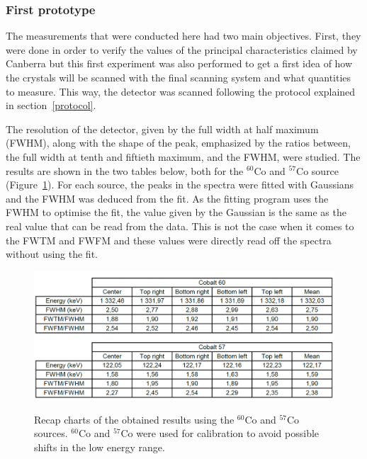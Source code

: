 \documentclass[11pt,a4paper]{article}
\begin{document}
\subsubsection{First prototype}

The measurements that were conducted here had two main objectives. First, they were done in order to verify the values of the principal characteristics claimed by Canberra but this first experiment was also performed to get a first idea of how the crystals will be scanned with the final scanning system and what quantities to measure. This way, the detector was scanned following the protocol explained in section~\ref{protocol}.

The resolution of the detector, given by the full width at half maximum (FWHM), along with the shape of the peak, emphasized by the ratios between, the full width at tenth and fiftieth maximum, and the FWHM, were studied. The results are shown in the two tables below, both for the $^{60}$Co and $^{57}$Co source (Figure~\ref{recap}). For each source, the peaks in the spectra were fitted with Gaussians and the FWHM was deduced from the fit. As the fitting program uses the FWHM to optimise the fit, the value given by the Gaussian is the same as the real value that can be read from the data. This is not the case when it comes to the FWTM and FWFM and these values were directly read off the spectra without using the fit.

\begin{figure}[!h]
\centering
\caption{Recap charts of the obtained results using the $^{60}$Co and $^{57}$Co sources. $^{60}$Co and $^{57}$Co were used for calibration to avoid possible shifts in the low energy range.}
\includegraphics[scale=0.6]{Scan_Cos_2.png}
\label{recap}
\end{figure}
\end{document}
